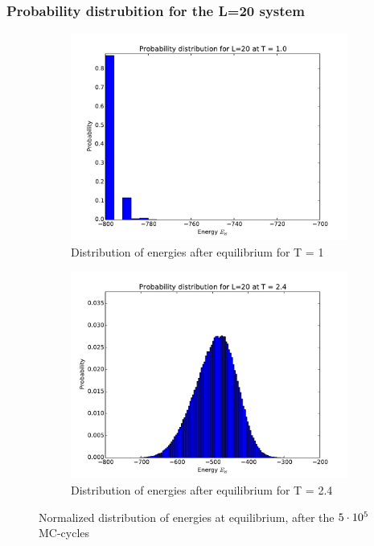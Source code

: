 \subsubsection{Probability distrubition  for the L=20 system}


	\begin{figure}[H]
	\begin{subfigure}[b]{0.49\textwidth}
	\includegraphics[width=1\linewidth]{../results/4d/PD_T_1MC_1e6}
\caption{Distribution of  energies after equilibrium for T = 1}
\label{fig:pdt1}
	\end{subfigure}
	\hfill
	\begin{subfigure}[b]{0.49\textwidth}
		\includegraphics[width=1\linewidth]{../results/4d/PD_T_2MC_1e6}
	\caption{Distribution of  energies after equilibrium for T = 2.4}
	\label{fig:pdt2_4}
	\end{subfigure}
	\caption{Normalized distribution of  energies at equilibrium,  after the $ 5\cdot 10^{5} $ MC-cycles}
	\label{fig:distribution}
\end{figure}



